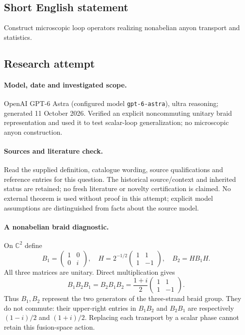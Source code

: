 \documentclass[11pt]{article}
\begin{document}
\subsection{Short English statement}
Construct microscopic loop operators realizing nonabelian anyon transport and statistics.
\subsection{Research attempt}
\paragraph{Model, date and investigated scope.}
OpenAI GPT-6 Astra (configured model \texttt{gpt-6-astra}), ultra reasoning; generated 11 October 2026. Verified an explicit noncommuting unitary braid representation and used it to test scalar-loop generalization; no microscopic anyon construction.

\paragraph{Sources and literature check.}
Read the supplied definition, catalogue wording, source qualifications and reference entries for this question. The historical source/context and inherited status are retained; no fresh literature or novelty certification is claimed. No external theorem is used without proof in this attempt; explicit model assumptions are distinguished from facts about the source model.

\paragraph{A nonabelian braid diagnostic.} On \(\mathbb C^2\) define
\[
 B_1=\begin{pmatrix}1&0\\0&i\end{pmatrix},\quad
 H=2^{-1/2}\begin{pmatrix}1&1\\1&-1\end{pmatrix},\quad B_2=HB_1H.
\]
All three matrices are unitary. Direct multiplication gives
\[
 B_1B_2B_1=B_2B_1B_2=\frac{1+i}{2}\begin{pmatrix}1&1\\1&-1\end{pmatrix}.
\]
Thus \(B_1,B_2\) represent the two generators of the three-strand braid group. They do not commute: their upper-right entries in \(B_1B_2\) and \(B_2B_1\) are respectively \((1-i)/2\) and \((1+i)/2\). Replacing each transport by a scalar phase cannot retain this fusion-space action.
\end{document}
